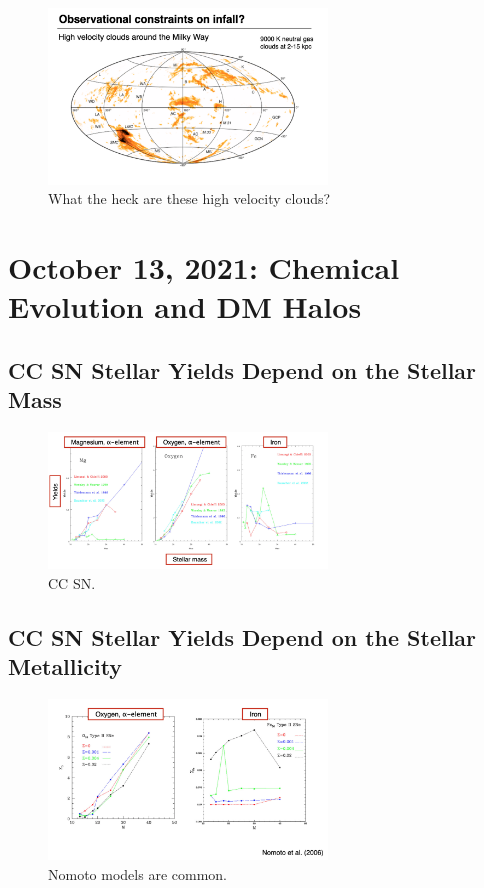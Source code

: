 \documentclass{article}
\begin{document}
\begin{figure}
    \centering
    \includegraphics[width=0.66\textwidth]{figs/Screen Shot 2021-10-08 at 11.00.55 AM.png}
    \caption{What the heck are these high velocity clouds?}
    \label{fig:hv_clouds}
\end{figure}


\section{October 13, 2021: Chemical Evolution and DM Halos}

\subsection{CC SN Stellar Yields Depend on the Stellar Mass}

\begin{figure}
    \centering
    \includegraphics[width=0.66\textwidth]{figs/Screen Shot 2021-10-13 at 9.45.24 AM.png}
    \caption{CC SN.}
    \label{fig:CCSn}
\end{figure}

\subsection{CC SN Stellar Yields Depend on the Stellar Metallicity}

\begin{figure}
    \centering
    \includegraphics[width=0.66\textwidth]{figs/Screen Shot 2021-10-13 at 9.47.32 AM.png}
    \caption{Nomoto models are common.}
    \label{fig:Nomoto}
\end{figure}
\end{document}
